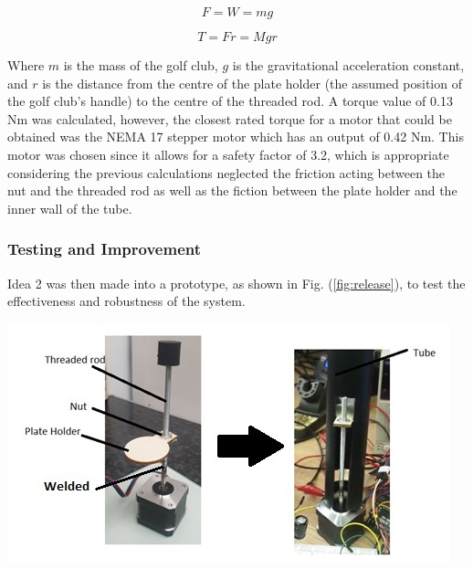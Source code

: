 \documentclass[11pt,landscape]{article}
\newenvironment{Figure}
  {\par\medskip\noindent\minipage{\linewidth}}
  {\endminipage\par\medskip}
\begin{document}
\begin{multicols}{2}
    \begin{center}
        \begin{equation}
            F = W = mg
            \label{eq:raising_force}
        \end{equation}
    \end{center}
    \begin{center}
        \begin{equation}
            T = Fr = Mgr
            \label{eq:raising_torque}
        \end{equation}
    \end{center}
    
    Where $m$ is the mass of the golf club, $g$ is the gravitational
    acceleration constant, and $r$ is the distance from the centre of the plate
    holder (the assumed position of the golf club’s handle) to the centre of the
    threaded rod. A torque value of 0.13 Nm was calculated, however, the closest
    rated torque for a motor that could be obtained was the NEMA 17 stepper
    motor which has an output of 0.42 Nm. This motor was chosen since it allows
    for a safety factor of 3.2, which is appropriate considering the previous
    calculations neglected the friction acting between the nut and the threaded
    rod as well as the fiction between the plate holder and the inner wall of
    the tube. 
    
    
    \subsubsection{Testing and Improvement}
    Idea 2 was then made into a prototype, as shown in Fig. (\ref{fig:release}),
    to test the effectiveness and robustness of the system. 
    
    \begin{Figure}
        \begin{center}
            \includegraphics[width=\textwidth]{Figure20.jpg}
            \label{fig:release}
        \end{center}
    \end{Figure}
    

\end{multicols}
\end{document}
